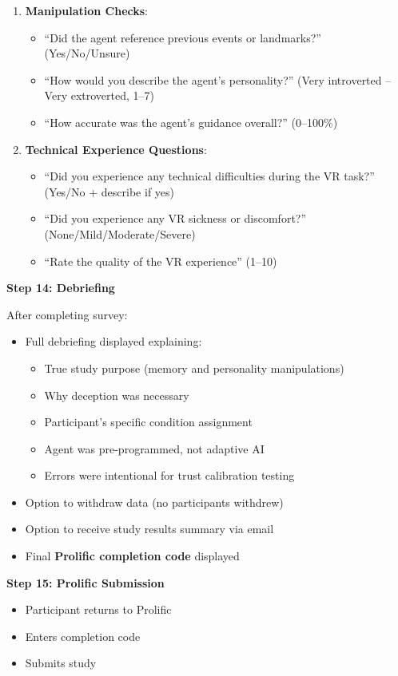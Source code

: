 \documentclass[12pt]{article}
\begin{document}
\begin{enumerate}
    \item \textbf{Manipulation Checks}:
    \begin{itemize}
        \item ``Did the agent reference previous events or landmarks?'' (Yes/No/Unsure)
        \item ``How would you describe the agent's personality?'' (Very introverted -- Very extroverted, 1--7)
        \item ``How accurate was the agent's guidance overall?'' (0--100\%)
    \end{itemize}
    
    \item \textbf{Technical Experience Questions}:
    \begin{itemize}
        \item ``Did you experience any technical difficulties during the VR task?'' (Yes/No + describe if yes)
        \item ``Did you experience any VR sickness or discomfort?'' (None/Mild/Moderate/Severe)
        \item ``Rate the quality of the VR experience'' (1--10)
    \end{itemize}
\end{enumerate}

\textbf{Step 14: Debriefing}

After completing survey:
\begin{itemize}
    \item Full debriefing displayed explaining:
    \begin{itemize}
        \item True study purpose (memory and personality manipulations)
        \item Why deception was necessary
        \item Participant's specific condition assignment
        \item Agent was pre-programmed, not adaptive AI
        \item Errors were intentional for trust calibration testing
    \end{itemize}
    \item Option to withdraw data (no participants withdrew)
    \item Option to receive study results summary via email
    \item Final \textbf{Prolific completion code} displayed
\end{itemize}

\textbf{Step 15: Prolific Submission}
\begin{itemize}
    \item Participant returns to Prolific
    \item Enters completion code
    \item Submits study
\end{itemize}
\end{document}
